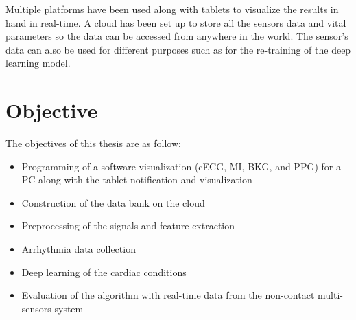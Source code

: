 Multiple platforms have been used along with tablets to visualize the results in hand in real-time. A cloud has been set up to store all the sensors data and vital parameters so the data can be accessed from anywhere in the world. The sensor's data can also be used for different purposes such as for the re-training of the deep learning model.


\section{Objective}

The objectives of this thesis are as follow:

\begin{itemize}
	\item Programming of a software visualization (cECG, MI, BKG, and PPG) for a PC along with the tablet notification and visualization
	\item Construction of the data bank on the cloud
	\item Preprocessing of the signals and feature extraction
	\item Arrhythmia data collection
	\item Deep learning of the cardiac conditions
	\item Evaluation of the algorithm with real-time data from the non-contact multi-sensors system
\end{itemize}


